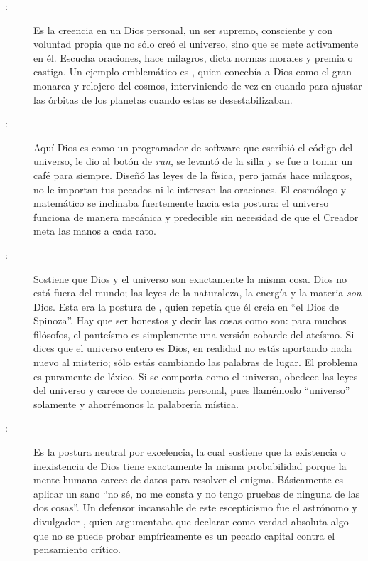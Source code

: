 \begin{description}
	\item[{}:] Es la creencia en un Dios personal, un ser supremo, consciente y con voluntad propia que no sólo creó el universo, sino que se mete activamente en él.
	      Escucha oraciones, hace milagros, dicta normas morales y premia o castiga.
	      Un ejemplo emblemático es , quien concebía a Dios como el gran monarca y relojero del cosmos, interviniendo de vez en cuando para ajustar las órbitas de los planetas cuando estas se desestabilizaban.

	\item[{}:] Aquí Dios es como un programador de software que escribió el código del universo, le dio al botón de \emph{run}, se levantó de la silla y se fue a tomar un café para siempre.
	      Diseñó las leyes de la física, pero jamás hace milagros, no le importan tus pecados ni le interesan las oraciones.
	      El cosmólogo y matemático  se inclinaba fuertemente hacia esta postura: el universo funciona de manera mecánica y predecible sin necesidad de que el Creador meta las manos a cada rato.

	\item[{}:] Sostiene que Dios y el universo son exactamente la misma cosa.
	      Dios no está fuera del mundo; las leyes de la naturaleza, la energía y la materia \emph{son} Dios.
	      Esta era la postura de , quien repetía que él creía en “el Dios de Spinoza”.
	      Hay que ser honestos y decir las cosas como son: para muchos filósofos, el panteísmo es simplemente una versión cobarde del ateísmo.
	      Si dices que el universo entero es Dios, en realidad no estás aportando nada nuevo al misterio; sólo estás cambiando las palabras de lugar.
	      El problema es puramente de léxico.
	      Si se comporta como el universo, obedece las leyes del universo y carece de conciencia personal, pues llamémoslo “universo” solamente y ahorrémonos la palabrería mística.

	\item[{}:] Es la postura neutral por excelencia, la cual sostiene que la existencia o inexistencia de Dios tiene exactamente la misma probabilidad porque la mente humana carece de datos para resolver el enigma.
	      Básicamente es aplicar un sano “no sé, no me consta y no tengo pruebas de ninguna de las dos cosas”.
	      Un defensor incansable de este escepticismo fue el astrónomo y divulgador \cite{Sagan1995}, quien argumentaba que declarar como verdad absoluta algo que no se puede probar empíricamente es un pecado capital contra el pensamiento crítico.


\end{description}
